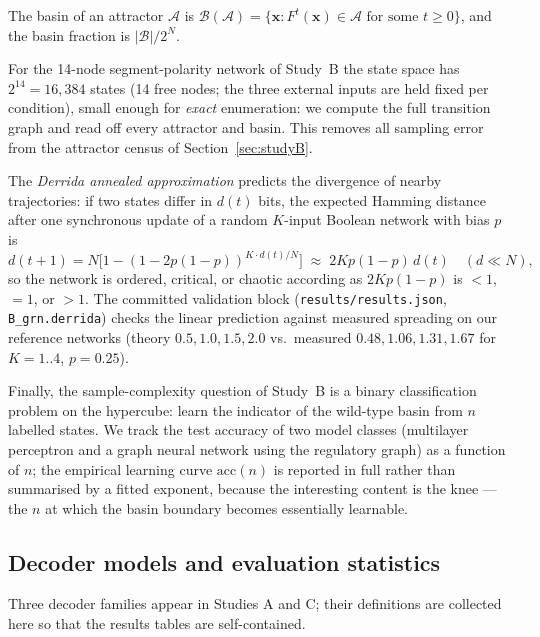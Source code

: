 \begin{definition}
The basin of an attractor $\mathcal{A}$ is
$\mathcal{B}(\mathcal{A}) = \{ \mathbf{x} : F^{t}(\mathbf{x}) \in \mathcal{A}
\text{ for some } t \ge 0 \}$, and the basin fraction is
$|\mathcal{B}|/2^N$.
\end{definition}

For the 14-node segment-polarity network of Study~B the state space has
$2^{14} = 16{,}384$ states (14 free nodes; the three external inputs are held
fixed per condition), small enough for \emph{exact} enumeration: we compute
the full transition graph and read off every attractor and basin. This removes
all sampling error from the attractor census of Section~\ref{sec:studyB}.

The \emph{Derrida annealed approximation} \cite{derrida1986} predicts the
divergence of nearby trajectories: if two states differ in $d(t)$ bits, the
expected Hamming distance after one synchronous update of a random $K$-input
Boolean network with bias $p$ is
\begin{equation}
d(t{+}1) = N \big[1 - (1 - 2 p (1-p))^{K \cdot d(t)/N}\big]
\;\approx\; 2 K p (1-p)\, d(t) \quad (d \ll N),
\label{eq:derrida}
\end{equation}
so the network is ordered, critical, or chaotic according as
$2 K p (1-p)$ is $< 1$, $=1$, or $> 1$. The committed validation block
(\texttt{results/results.json}, \texttt{B\_grn.derrida}) checks the linear
prediction against measured spreading on our reference networks (theory
$0.5, 1.0, 1.5, 2.0$ vs.\ measured $0.48, 1.06, 1.31, 1.67$ for $K = 1..4$,
$p = 0.25$).

Finally, the sample-complexity question of Study~B is a binary classification
problem on the hypercube: learn the indicator of the wild-type basin from
$n$ labelled states. We track the test accuracy of two model classes
(multilayer perceptron and a graph neural network using the regulatory graph)
as a function of $n$; the empirical learning curve
$\mathrm{acc}(n)$ is reported in full rather than summarised by a fitted
exponent, because the interesting content is the knee --- the $n$ at which the
basin boundary becomes essentially learnable.

\subsection{Decoder models and evaluation statistics}
\label{sec:math-decoders}

Three decoder families appear in Studies A and C; their definitions are
collected here so that the results tables are self-contained.

